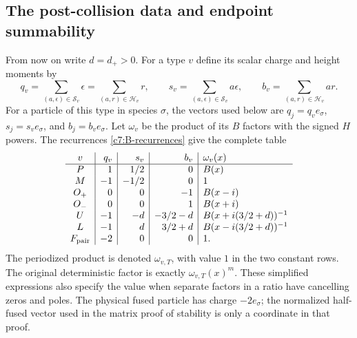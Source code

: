 \subsection{The post-collision data and endpoint summability}

From now on write $d=d_+>0$.  For a type $v$ define its scalar charge and
height moments by
\[
q_v=\sum_{(a,\epsilon)\in\mathscr S_v}\epsilon
    =\sum_{(a,r)\in\mathscr H_v}r,\qquad
s_v=\sum_{(a,\epsilon)\in\mathscr S_v}a\epsilon,\qquad
b_v=\sum_{(a,r)\in\mathscr H_v}ar.
\]
For a particle of this type in species $\sigma$, the vectors used below are
$q_j=q_ve_\sigma$, $s_j=s_ve_\sigma$, and $b_j=b_ve_\sigma$.
Let $\omega_v$ be the product of its $B$ factors with the signed $H$ powers.
The recurrences \eqref{c7:B-recurrences} give the complete table
\begin{equation}\label{c7:particle-data}
\begin{array}{c|r|r|r|l}
v&q_v&s_v&b_v&\omega_v(x)\\\hline
P&1&1/2&0&B(x)\\
M&-1&-1/2&0&1\\
O_+&0&0&-1&B(x-i)\\
O_-&0&0&1&B(x+i)\\
U&-1&-d&-3/2-d&B(x+i(3/2+d))^{-1}\\
L&-1&d&3/2+d&B(x-i(3/2+d))^{-1}\\
F_{\rm pair}&-2&0&0&1.
\end{array}
\end{equation}
The periodized product is denoted $\omega_{v,T}$, with value $1$ in the two
constant rows.  The original deterministic factor is exactly
$\omega_{v,T}(x)^m$.  These simplified expressions also specify the value
when separate factors in a ratio have cancelling zeros and poles.  The
physical fused particle has charge $-2e_\sigma$; the normalized half-fused
vector used in the matrix proof of stability is only a coordinate in that
proof.

